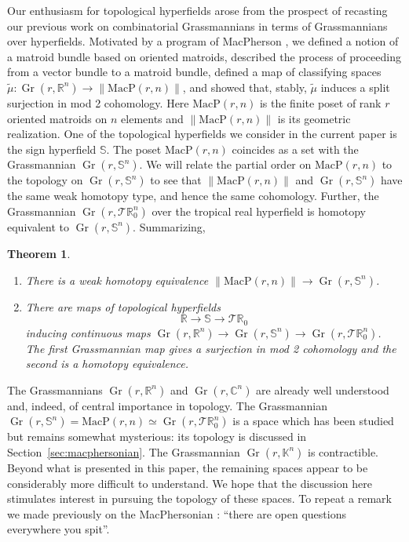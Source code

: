 \documentclass[10pt, preprint]{article}
\newtheorem{theorem}{Theorem}[section]
\theoremstyle{definition}
\begin{document}
Our enthusiasm for topological hyperfields arose from the prospect of
recasting our previous work \cite{Anderson-Davis} on combinatorial
Grassmannians in terms of Grassmannians over hyperfields. Motivated by
a program of MacPherson \cite{MacPherson}, we defined a notion of
a matroid bundle based on oriented matroids, described the process of
proceeding from a vector bundle to a matroid bundle, defined a map of
classifying spaces ${\widetilde{\mu }}: \operatorname{Gr}(r,
\mathbb{R}^{n}) \to \|\mathrm{MacP}(r,n)\|$, and showed that, stably,
${\widetilde{\mu }}$ induces a split surjection in mod 2 cohomology.
Here $\mathrm{MacP}(r,n)$ is the finite poset of rank $r$ oriented
matroids on $n$ elements and $\|\mathrm{MacP}(r,n)\|$ is its geometric
realization. One of the topological hyperfields we consider in the
current paper is the sign hyperfield $\mathbb{S}$. The poset
$\mathrm{MacP}(r,n)$ coincides as a set with the Grassmannian
$\operatorname{Gr}(r, \mathbb{S}^{n})$. We will relate the partial order
on $\mathrm{MacP}(r,n)$ to the topology on $\operatorname{Gr}(r,
\mathbb{S}^{n})$ to see that $\|\mathrm{MacP}(r,n)\|$ and $
\operatorname{Gr}(r, \mathbb{S}^{n})$ have the same weak homotopy type,
and hence the same cohomology. Further, the Grassmannian $
\operatorname{Gr}(r, \mathcal{T }\mathbb{R}_{0}^{n})$ over the tropical
real hyperfield is homotopy equivalent to $\operatorname{Gr}(r,
\mathbb{S}^{n})$. Summarizing,
%
\begin{theorem}
\label{cohomology}
%
\begin{enumerate}[\textit{2.}]%
\item[\textit{1.}]
There is a weak homotopy equivalence $\|\mathrm{MacP}(r,n)\| \to
\operatorname{Gr}(r,\mathbb{S}^{n})$.
%
\item[\textit{2.}]
There are maps of topological hyperfields
%
\begin{equation*}
\mathbb{R}\to \mathbb{S}\to \mathcal{T }\mathbb{R}_{0}
\end{equation*}
%
inducing continuous maps $ \operatorname{Gr}(r, \mathbb{R}^{n})
\to \operatorname{Gr}(r, \mathbb{S}^{n}) \to \operatorname{Gr}(r,
\mathcal{T }\mathbb{R}_{0}^{n})$. The first Grassmannian map gives a
surjection in mod 2 cohomology and the second is a homotopy equivalence.
\end{enumerate}
%
\end{theorem}

The Grassmannians $\operatorname{Gr}(r,\mathbb{R}^{n})$ and
$\operatorname{Gr}(r, \mathbb{C}^{n})$ are already well understood and,
indeed, of central importance in topology. The Grassmannian
$\operatorname{Gr}(r,\mathbb{S}^{n})= \mathrm{MacP}(r,n) \simeq
\operatorname{Gr}(r,\mathcal{T }\mathbb{R}_{0}^{n})$ is a space which
has been studied but remains somewhat mysterious: its topology is
discussed in Section~\ref{sec:macphersonian}. The Grassmannian
$\operatorname{Gr}(r,\mathbb{K}^{n})$ is contractible. Beyond what is
presented in this paper, the remaining spaces appear to be considerably
more difficult to understand. We hope that the discussion here
stimulates interest in pursuing the topology of these spaces. To repeat
a remark we made previously on the MacPhersonian
\cite{Anderson-Davis}: ``there are open questions everywhere you spit''.
\end{document}
